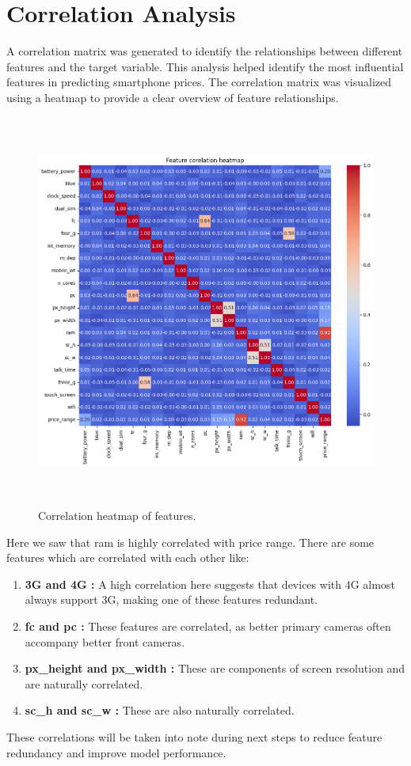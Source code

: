 \documentclass[12pt]{report}
\begin{document}
\section{Correlation Analysis}
A correlation matrix was generated to identify the relationships between different features and the target variable. This analysis helped identify the most influential features in predicting smartphone prices. The correlation matrix was visualized using a heatmap to provide a clear overview of feature relationships.
\begin{figure}[H]
	\centering
	\includegraphics[height=35em]{corr_viz.png}
	\caption{Correlation heatmap of features.}
	\label{corr_viz}
\end{figure}
Here we saw that ram is highly correlated with price range. There are some features which are correlated with each other like:
\vspace{-1.25em}
\begin{enumerate}
	\setlength\itemsep{-1.05em}
	\item{\textbf{3G and 4G :}} A high correlation here suggests that devices with 4G almost always support 3G, making one of these features redundant.
	\item{\textbf{fc and pc :}} These features are correlated, as better primary cameras often accompany better front cameras.
	\item{\textbf{px\_height and px\_width :}} These are components of screen resolution and are naturally correlated.
	\item{\textbf{sc\_h and sc\_w :}} These are also naturally correlated.
\end{enumerate}
These correlations will be taken into note during next steps to reduce feature redundancy and improve model performance.
\end{document}
